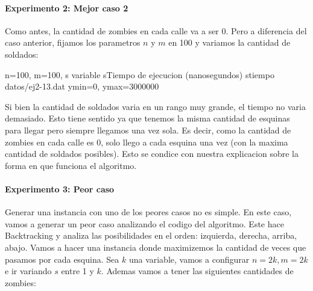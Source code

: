 \paragraph{Experimento 2: Mejor caso 2}

Como antes, la cantidad de zombies en cada calle va a ser 0. Pero a diferencia del caso anterior, fijamos los parametros $n$ y $m$ en 100 y variamos la cantidad de soldados:

\graficarDatosPlus
{n=100, m=100, s variable}
{s}{Tiempo de ejecucion (nanosegundos)}
{s}{tiempo}
{datos/ej2-13.dat}
{ymin=0, ymax=3000000}

Si bien la cantidad de soldados varia en un rango muy grande, el tiempo no varia demasiado. Esto tiene sentido ya que tenemos la misma cantidad de esquinas para llegar pero siempre llegamos una vez sola. Es decir, como la cantidad de zombies en cada calle es 0, solo llego a cada esquina una vez (con la maxima cantidad de soldados posibles). Esto se condice con nuestra explicacion sobre la forma en que funciona el algoritmo.

\paragraph{Experimento 3: Peor caso}

Generar una instancia con uno de los peores casos no es simple. En este caso, vamos a generar un peor caso analizando el codigo del algoritmo. Este hace Backtracking y analiza las posibilidades en el orden: izquierda, derecha, arriba, abajo. Vamos a hacer una instancia donde maximizemos la cantidad de veces que pasamos por cada esquina. Sea $k$ una variable, vamos a configurar $n=2k, m=2k$ e ir variando $s$ entre 1 y $k$. Ademas vamos a tener las siguientes cantidades de zombies:

\newarray\data
{}%

